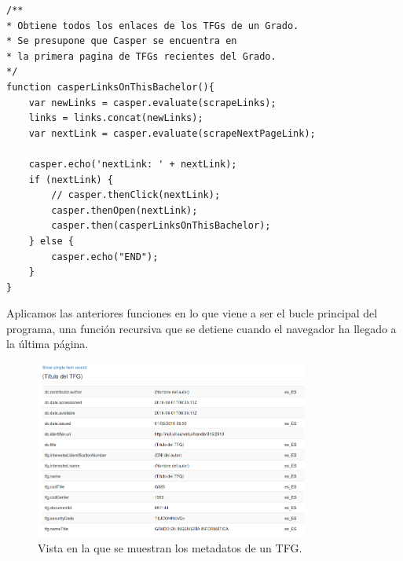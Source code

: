 \begin{center}
\begin{minipage}{\linewidth}
\begin{lstlisting}[caption=Función de obtención de todos los enlaces de TFG.]
/**
* Obtiene todos los enlaces de los TFGs de un Grado.
* Se presupone que Casper se encuentra en
* la primera pagina de TFGs recientes del Grado.
*/
function casperLinksOnThisBachelor(){
    var newLinks = casper.evaluate(scrapeLinks);
    links = links.concat(newLinks);
    var nextLink = casper.evaluate(scrapeNextPageLink);

    casper.echo('nextLink: ' + nextLink);
    if (nextLink) {
        // casper.thenClick(nextLink);
        casper.thenOpen(nextLink);
        casper.then(casperLinksOnThisBachelor);
    } else {
        casper.echo("END");
    }
}
\end{lstlisting}
\end{minipage}
\end{center}

Aplicamos las anteriores funciones en lo que viene a ser el bucle principal del programa, una función recursiva que se detiene cuando el navegador ha llegado a la última página.

\begin{center}
\begin{figure}[!ht]
  \caption{Vista en la que se muestran los metadatos de un TFG.}
  \label{fig:metadata-view}
  \centering
    \includegraphics[width=0.8\textwidth]{Images/metadata_view}
\end{figure}
\end{center}

